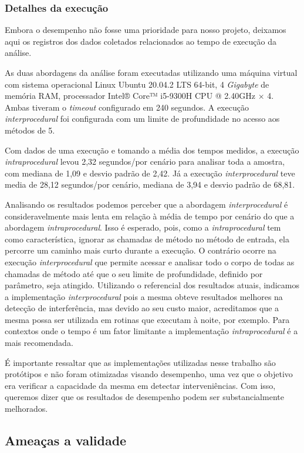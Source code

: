 \subsubsection{Detalhes da execução}
Embora o desempenho não fosse uma prioridade para nosso projeto, deixamos aqui os registros dos dados coletados relacionados ao tempo de execução da análise.

As duas abordagens da análise foram executadas utilizando uma máquina virtual com sistema operacional Linux Ubuntu 20.04.2 LTS 64-bit, 4 \emph{Gigabyte} de memória RAM, processador Intel® Core™ i5-9300H CPU @ 2.40GHz × 4. Ambas tiveram o \emph{timeout} configurado em 240 segundos. A execução \emph{interprocedural} foi configurada com um limite de profundidade no acesso aos métodos de 5. 

Com dados de uma execução e tomando a média dos tempos medidos, a execução \emph{intraprocedural} levou 2,32 segundos/por cenário para analisar toda a amostra, com mediana de 1,09 e desvio padrão de 2,42.  Já a execução \emph{interprocedural} teve media de 28,12 segundos/por cenário, mediana de 3,94 e desvio padrão de 68,81.

Analisando os resultados podemos perceber que a abordagem \emph{interprocedural} é consideravelmente mais lenta em relação à média de tempo por cenário do que a abordagem \emph{intraprocedural}. Isso é esperado, pois, como a \emph{intraprocedural} tem como característica, ignorar as chamadas de método no método de entrada, ela percorre um caminho mais curto durante a execução. O contrário ocorre na execução \emph{interprocedural} que permite acessar e analisar todo o corpo de todas as chamadas de método até que o seu limite de profundidade, definido por parâmetro, seja atingido. Utilizando o referencial dos resultados atuais, indicamos a implementação \emph{interprocedural} pois a mesma obteve resultados melhores na detecção de interferência, mas devido ao seu custo maior, acreditamos que a mesma possa ser utilizada em rotinas que executam à noite, por exemplo. Para contextos onde o tempo é um fator limitante a implementação \emph{intraprocedural} é a mais recomendada. 

É importante ressaltar que as implementações utilizadas nesse trabalho são protótipos e não foram otimizadas visando desempenho, uma vez que o objetivo era verificar a capacidade da mesma em detectar interveniências. Com isso, queremos dizer que os resultados de desempenho podem ser substancialmente melhorados.  

\subsection{Ameaças a validade}

